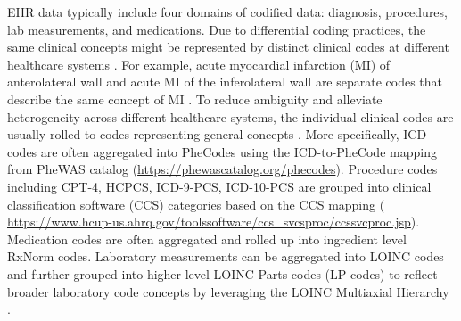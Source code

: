 EHR data typically include four domains of codified data: diagnosis, procedures, lab measurements, and medications. Due to differential coding practices, the same clinical concepts might be represented by distinct clinical codes at different healthcare systems \cite{hernandez2009automated, abhyankar2012standardizing}. For example, acute myocardial infarction (MI) of anterolateral wall and acute MI of the inferolateral wall are separate codes that describe the same concept of MI \cite{hong2021clinical}. To reduce ambiguity and alleviate  heterogeneity across different healthcare systems, the individual clinical codes are usually rolled to codes representing general concepts \cite{hong2021clinical,zhou2022multiview}. More specifically,  ICD codes are often aggregated into PheCodes using the ICD-to-PheCode mapping from PheWAS catalog (\href{https://phewascatalog.org/phecodes}{https://phewascatalog.org/phecodes}). Procedure codes including CPT-4, HCPCS, ICD-9-PCS, ICD-10-PCS are grouped into clinical classification software (CCS) categories based on the CCS mapping ( \href{https://www.hcup-us.ahrq.gov/toolssoftware/ccs_svcsproc/ccssvcproc.jsp}{https://www.hcup-us.ahrq.gov/toolssoftware/ccs\_svcsproc/ccssvcproc.jsp}). Medication codes are often aggregated and rolled up into ingredient level RxNorm codes. 
Laboratory measurements can be aggregated into LOINC codes and further grouped into higher level LOINC Parts codes (LP codes) to reflect broader laboratory code concepts by leveraging the LOINC Multiaxial Hierarchy \cite{mcdonald2004logical}.













 
 

